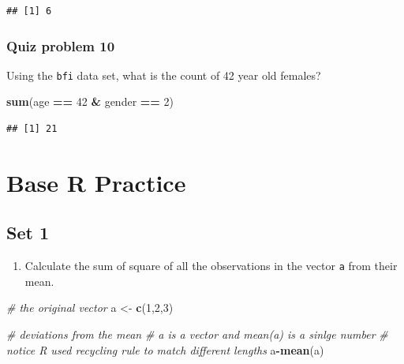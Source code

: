 \documentclass[]{book}
\newenvironment{Shaded}{\begin{snugshade}}{\end{snugshade}}
\newcommand{\CommentTok}[1]{\textcolor[rgb]{0.56,0.35,0.01}{\textit{#1}}}
\newcommand{\DecValTok}[1]{\textcolor[rgb]{0.00,0.00,0.81}{#1}}
\newcommand{\KeywordTok}[1]{\textcolor[rgb]{0.13,0.29,0.53}{\textbf{#1}}}
\newcommand{\NormalTok}[1]{#1}
\newcommand{\OperatorTok}[1]{\textcolor[rgb]{0.81,0.36,0.00}{\textbf{#1}}}
\newcommand{\StringTok}[1]{\textcolor[rgb]{0.31,0.60,0.02}{#1}}
\providecommand{\tightlist}{%
  \setlength{\itemsep}{0pt}\setlength{\parskip}{0pt}}
\begin{document}
\begin{verbatim}
## [1] 6
\end{verbatim}

\hypertarget{quiz-problem-10}{%
\subsection{Quiz problem 10}\label{quiz-problem-10}}

Using the \texttt{bfi} data set, what is the count of 42 year old females?

\begin{Shaded}
\begin{Highlighting}[]
\KeywordTok{sum}\NormalTok{(age }\OperatorTok{==}\StringTok{ }\DecValTok{42} \OperatorTok{&}\StringTok{ }\NormalTok{gender }\OperatorTok{==}\StringTok{ }\DecValTok{2}\NormalTok{)}
\end{Highlighting}
\end{Shaded}

\begin{verbatim}
## [1] 21
\end{verbatim}

\hypertarget{base-r-practice}{%
\chapter{Base R Practice}\label{base-r-practice}}

\hypertarget{set-1}{%
\section{Set 1}\label{set-1}}

\begin{enumerate}
\def\labelenumi{\arabic{enumi}.}
\tightlist
\item
  Calculate the sum of square of all the observations in the vector \texttt{a} from their mean.
\end{enumerate}

\begin{Shaded}
\begin{Highlighting}[]
\CommentTok{# the original vector }
\NormalTok{a <-}\StringTok{ }\KeywordTok{c}\NormalTok{(}\DecValTok{1}\NormalTok{,}\DecValTok{2}\NormalTok{,}\DecValTok{3}\NormalTok{)}
\end{Highlighting}
\end{Shaded}

\begin{Shaded}
\begin{Highlighting}[]
\CommentTok{# deviations from the mean}
\CommentTok{# a is a vector and mean(a) is a sinlge number}
\CommentTok{# notice R used recycling rule to match different lengths}
\NormalTok{a}\OperatorTok{-}\KeywordTok{mean}\NormalTok{(a)}
\end{Highlighting}
\end{Shaded}
\end{document}
